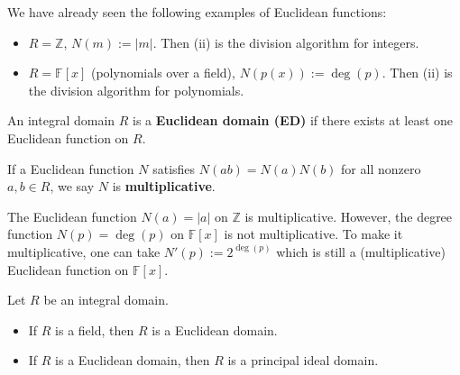 \begin{example}
We have already seen the following examples of Euclidean functions:
\begin{itemize}
    \item $R = \mathbb{Z}$, $N(m) := |m|$. Then (ii) is the division algorithm for integers.
    \item $R = \mathbb{F}[x]$ (polynomials over a field), $N(p(x)) := \deg(p)$. Then (ii) is the division algorithm for polynomials.
\end{itemize}
\end{example}

\begin{definition}
An integral domain $R$ is a \textbf{Euclidean domain (ED)} if there exists at least one Euclidean function on $R$. 

If a Euclidean function $N$ satisfies $N(ab) = N(a)N(b)$ for all nonzero $a, b \in R$, we say $N$ is \textbf{multiplicative}.
\end{definition}

\begin{remark}
The Euclidean function $N(a) = |a|$ on $\mathbb{Z}$ is multiplicative. However, the degree function $N(p) = \deg(p)$ on $\mathbb{F}[x]$ is not multiplicative. To make it multiplicative, one can take $N'(p) := 2^{\deg(p)}$ which is still a (multiplicative) Euclidean function on $\mathbb{F}[x]$.
\end{remark}

\begin{theorem}
Let $R$ be an integral domain.
\begin{itemize}
    \item[(a)] If $R$ is a field, then $R$ is a Euclidean domain.
    \item[(b)] If $R$ is a Euclidean domain, then $R$ is a principal ideal domain.
\end{itemize}
\end{theorem}


